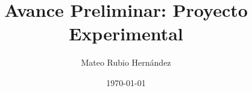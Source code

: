 \documentclass[12pt,a4paper]{article}
\title{Avance Preliminar: Proyecto Experimental}
\author{Mateo Rubio Hernández}
\date{\today}
\begin{document}
\maketitle

\begin{abstract}
\lipsum[1]
\end{abstract}
\lipsum[2]
\end{document}
